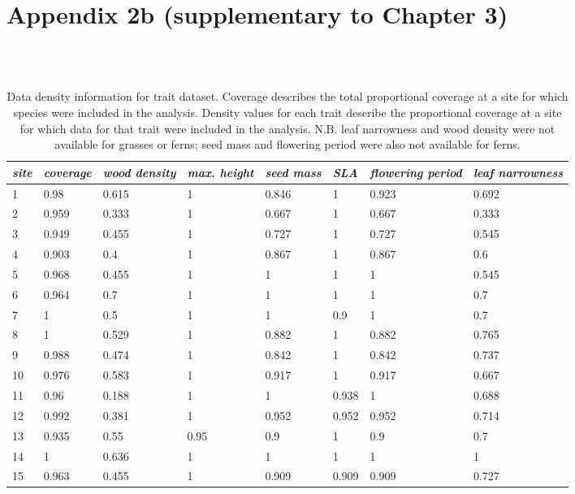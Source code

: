 \chapter[Appendix 2b]{Appendix 2b (supplementary to Chapter 3)}

\begin{landscape}
\begin{table}[ht]
\tiny
\centering
\caption[Data density information for trait dataset.]{\small{Data density information for trait dataset. Coverage describes the total proportional coverage at a site for which species were included in the analysis. Density values for each trait describe the proportional coverage at a site for which data for that trait were included in the analysis. N.B. leaf narrowness and wood density were not available for grasses or ferns; seed mass and flowering period were also not available for ferns.}} \\
\label{Ch3sup2_T1} \\
{\tabulinesep=1.2mm
\begin{tabu} to \linewidth {XXXXXXXX}
\hline
\textit{site} & \textit{coverage} & \textit{wood density} & \textit{max. height} & \textit{seed mass} & \textit{SLA} & \textit{flowering period} & \textit{leaf narrowness} \\
 & 0.98 & 0.615 & 1 & 0.846 & 1 & 0.923 & 0.692 \\
2 & 0.959 & 0.333 & 1 & 0.667 & 1 & 0.667 & 0.333 \\
3 & 0.949 & 0.455 & 1 & 0.727 & 1 & 0.727 & 0.545 \\
4 & 0.903 & 0.4 & 1 & 0.867 & 1 & 0.867 & 0.6 \\
5 & 0.968 & 0.455 & 1 & 1 & 1 & 1 & 0.545 \\
6 & 0.964 & 0.7 & 1 & 1 & 1 & 1 & 0.7 \\
7 & 1 & 0.5 & 1 & 1 & 0.9 & 1 & 0.7 \\
8 & 1 & 0.529 & 1 & 0.882 & 1 & 0.882 & 0.765 \\
9 & 0.988 & 0.474 & 1 & 0.842 & 1 & 0.842 & 0.737 \\
10 & 0.976 & 0.583 & 1 & 0.917 & 1 & 0.917 & 0.667 \\
11 & 0.96 & 0.188 & 1 & 1 & 0.938 & 1 & 0.688 \\
12 & 0.992 & 0.381 & 1 & 0.952 & 0.952 & 0.952 & 0.714 \\
13 & 0.935 & 0.55 & 0.95 & 0.9 & 1 & 0.9 & 0.7 \\
14 & 1 & 0.636 & 1 & 1 & 1 & 1 & 1 \\
15 & 0.963 & 0.455 & 1 & 0.909 & 0.909 & 0.909 & 0.727 \\
\hline
\end{tabu}}
\end{table}
\end{landscape}
\clearpage

